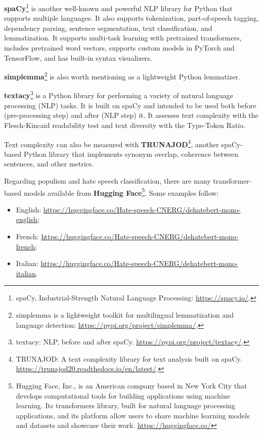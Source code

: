 \textbf{spaCy}\footnote{spaCy, Industrial-Strength Natural Language Processing: \url{https://spacy.io/}.} is another well-known and powerful NLP library for Python that supports multiple languages. It also supports tokenization, part-of-speech tagging, dependency parsing, sentence segmentation, text classification, and lemmatization. It supports multi-task learning with pretrained transformers, includes pretrained word vectors, supports custom models in PyTorch and TensorFlow, and has built-in syntax visualizers.

\textbf{simplemma}\footnote{simplemma is a lightweight toolkit for multilingual lemmatization and language detection: \url{https://pypi.org/project/simplemma/}.} is also worth mentioning as a lightweight Python lemmatizer.

\textbf{textacy}\footnote{textacy: NLP, before and after spaCy. \url{https://pypi.org/project/textacy/}.} is a Python library for performing a variety of natural language processing (NLP) tasks. It is built on spaCy and intended to be used both before (pre-processing step) and after (NLP step) it. It assesses text complexity with the Flesch-Kincaid readability test and text diversity with the Type-Token Ratio. 

Text complexity can also be measured with \textbf{TRUNAJOD}\footnote{TRUNAJOD: A text complexity library for text analysis built on spaCy. \url{https://trunajod20.readthedocs.io/en/latest/}.}, another spaCy-based Python library that implements synonym overlap, coherence between sentences, and other metrics. 

Regarding populism and hate speech classification, there are many transformer-based models available from \textbf{Hugging Face}\footnote{Hugging Face, Inc., is an American company based in New York City that develops computational tools for building applications using machine learning. Its transformers library, built for natural language processing applications, and its platform allow users to share machine learning models and datasets and showcase their work. \url{https://huggingface.co/}}. Some examples follow:

\begin{itemize}
    \item English: \url{https://huggingface.co/Hate-speech-CNERG/dehatebert-mono-english};
    \item French: \url{https://huggingface.co/Hate-speech-CNERG/dehatebert-mono-french};
    \item Italian: \url{https://huggingface.co/Hate-speech-CNERG/dehatebert-mono-italian}.
\end{itemize}


